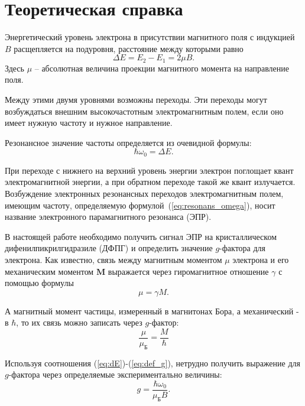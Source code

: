 \documentclass[a4paper, 12pt]{article}
\begin{document}
\tableofcontents
\newpage

\section{Теоретическая справка} 

Энергетический уровень электрона в присутствии магнитного поля с индукцией $B$ расщепляется на подуровня, расстояние между которыми равно 
	\begin{equation}
		\label{eq:dE}
		\Delta E = E_2 - E_1 = 2\mu B.
	\end{equation}
	Здесь $\mu$ -- абсолютная величина проекции магнитного момента на направление поля.
	
	Между этими двумя уровнями возможны переходы. Эти переходы могут возбуждаться внешним высокочастотным электромагнитным полем, если оно имеет нужную частоту и нужное направление.
	
	Резонансное значение частоты определяется из очевидной формулы:
	\begin{equation}
		\label{eq:resonans_omega}
		\hbar \omega_0 = \Delta E.
	\end{equation}

	При переходе с нижнего на верхний уровень энергии электрон поглощает квант электромагнитной энергии, а при обратном переходе такой же квант излучается. Возбуждение электронных резонансных переходов электромагнитным полем, имеющим частоту, определяемую формулой~(\ref{eq:resonans_omega}), носит название электронного парамагнитного резонанса (ЭПР).
	
	В настоящей работе необходимо получить сигнал ЭПР на кристаллическом дифенилпикрилгидразиле (ДФПГ) и определить значение $g$-фактора для электрона. Как известно, связь между магнитным моментом $\mu$ электрона и его механическим моментом $\mathbf{M}$ выражается через гиромагнитное отношение $\gamma$ с помощью формулы
	\begin{equation}
		\label{eq:gyromagnit}
	    \mu = \gamma M.
	\end{equation}
	
	А магнитный момент частицы, измеренный в магнитонах Бора, а механический - в $\hbar$, то их связь можно записать через $g$-фактор:
	\begin{equation}
	    \label{eq:def_g}
	    \frac{\mu}{\mu_\text{Б}} = \frac{M}{\hbar} 
	\end{equation}

	Используя соотношения (\ref{eq:dE})-(\ref{eq:def_g}), нетрудно получить выражение для $g$-фактора через определяемые экспериментально величины:
	\begin{equation}
		\label{eq:g_is}
		\tag{$\star$}
		g = \frac{\hbar \omega_0}{\mu_\text{Б} B}.
	\end{equation}
\end{document}
